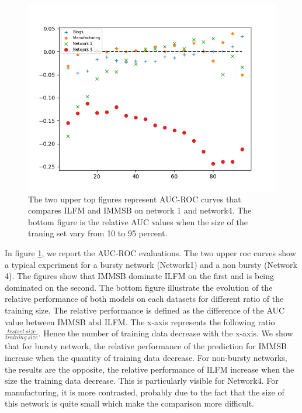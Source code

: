 \begin{figure}[h]
\begin{minipage}{0.4\textwidth}
            \includegraphics[width=\textwidth]{img/corpus/testset_max_20_roc_evolution.png}
        \end{minipage}
        \caption{The two upper top figures represent AUC-ROC curves that compares ILFM and IMMSB on network 1 and network4. The bottom figure is the relative AUC values when the size of the traning set vary from 10 to 95 percent. } 
	\label{fig:auc}
\end{figure}


In figure \ref{fig:auc}, we report the AUC-ROC evaluations. The two upper roc curves show a typical experiment for a bursty network (Network1) and a non bursty (Network 4). The figures show that IMMSB dominate ILFM on the first and is being dominated on the second. The bottom figure illustrate the evolution of the relative performance of both models on each datasets for different ratio of the training size. The relative performance  is defined as the difference of the AUC value between IMMSB abd ILFM. The x-axis represents the following ratio $\frac{testset\ size}{training\ size}$. Hence the number of training data decrease with the x-axis. We show that for bursty network, the relative performance of the prediction for IMMSB increase when the quantity of training data decrease. For non-bursty networks, the results are the opposite, the relative performance of ILFM increase when the size the training data decrease. This is particularly visible for Network4. For manufacturing, it is more contrasted, probably due to the fact that the size of this network is quite small which make the comparison more difficult.


